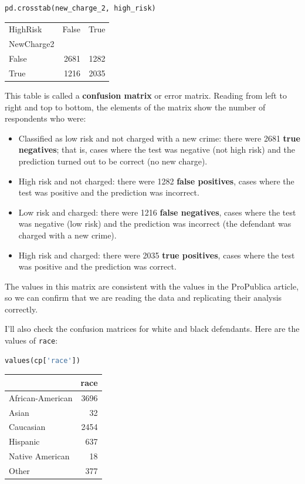 \begin{lstlisting}[language=Python]
pd.crosstab(new_charge_2, high_risk)
\end{lstlisting}

\begin{tabular}{lrr}
\toprule
HighRisk &  False &  True  \\
NewCharge2 &        &        \\
\midrule
False      &   2681 &   1282 \\
True       &   1216 &   2035 \\
\bottomrule
\end{tabular}

This table is called a \textbf{confusion matrix} or error matrix.
Reading from left to right and top to bottom, the elements of the matrix
show the number of respondents who were:

\begin{itemize}
\item
  Classified as low risk and not charged with a new crime: there were
  2681 \textbf{true negatives}; that is, cases where the test was
  negative (not high risk) and the prediction turned out to be correct
  (no new charge).
\item
  High risk and not charged: there were 1282 \textbf{false positives},
  cases where the test was positive and the prediction was incorrect.
\item
  Low risk and charged: there were 1216 \textbf{false negatives}, cases
  where the test was negative (low risk) and the prediction was
  incorrect (the defendant was charged with a new crime).
\item
  High risk and charged: there were 2035 \textbf{true positives}, cases
  where the test was positive and the prediction was correct.
\end{itemize}

The values in this matrix are consistent with the values in the
ProPublica article, so we can confirm that we are reading the data and
replicating their analysis correctly.

I'll also check the confusion matrices for white and black defendants.
Here are the values of \passthrough{\lstinline!race!}:

\begin{lstlisting}[language=Python]
values(cp['race'])
\end{lstlisting}

\begin{tabular}{lr}
\toprule
{} &  race \\
\midrule
African-American &  3696 \\
Asian            &    32 \\
Caucasian        &  2454 \\
Hispanic         &   637 \\
Native American  &    18 \\
Other            &   377 \\
\bottomrule
\end{tabular}

